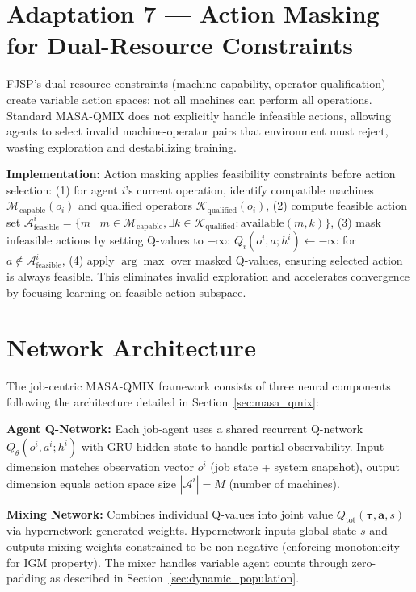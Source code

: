 \section{Adaptation 7 — Action Masking for Dual-Resource Constraints}
\label{sec:action_masking}

FJSP's dual-resource constraints (machine capability, operator qualification) create variable action spaces: not all machines can perform all operations. Standard MASA-QMIX does not explicitly handle infeasible actions, allowing agents to select invalid machine-operator pairs that environment must reject, wasting exploration and destabilizing training.

\textbf{Implementation:} Action masking applies feasibility constraints before action selection: (1) for agent \( i \)'s current operation, identify compatible machines \( \mathcal{M}_{\text{capable}}(o_i) \) and qualified operators \( \mathcal{K}_{\text{qualified}}(o_i) \), (2) compute feasible action set \( \mathcal{A}_{\text{feasible}}^i = \{ m \mid m \in \mathcal{M}_{\text{capable}}, \exists k \in \mathcal{K}_{\text{qualified}} : \text{available}(m, k) \} \), (3) mask infeasible actions by setting Q-values to \( -\infty \): \( Q_i(o^i, a; h^i) \leftarrow -\infty \) for \( a \notin \mathcal{A}_{\text{feasible}}^i \), (4) apply \( \arg\max \) over masked Q-values, ensuring selected action is always feasible. This eliminates invalid exploration and accelerates convergence by focusing learning on feasible action subspace.


\section{Network Architecture}
\label{sec:architecture}

The job-centric MASA-QMIX framework consists of three neural components following the architecture detailed in Section~\ref{sec:masa_qmix}:

\textbf{Agent Q-Network:} Each job-agent uses a shared recurrent Q-network \( Q_{\theta}(o^i, a^i; h^i) \) with GRU hidden state to handle partial observability. Input dimension matches observation vector \( o^i \) (job state + system snapshot), output dimension equals action space size \( |\mathcal{A}^i| = M \) (number of machines).

\textbf{Mixing Network:} Combines individual Q-values into joint value \( Q_{\text{tot}}(\boldsymbol{\tau}, \mathbf{a}, s) \) via hypernetwork-generated weights. Hypernetwork inputs global state \( s \) and outputs mixing weights constrained to be non-negative (enforcing monotonicity for IGM property). The mixer handles variable agent counts through zero-padding as described in Section~\ref{sec:dynamic_population}.

